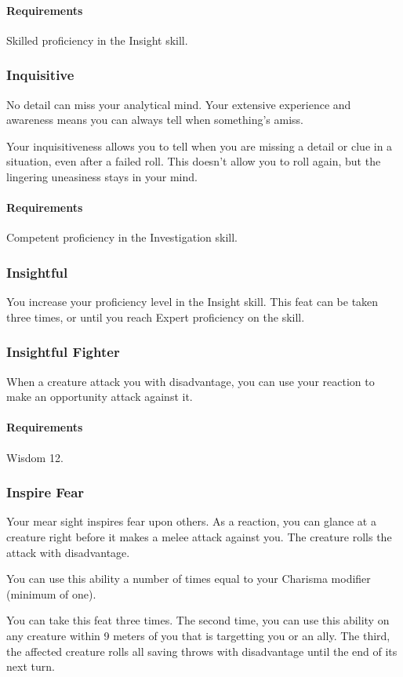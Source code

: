     \paragraph{Requirements} Skilled proficiency in the Insight skill.
\subsubsection{Inquisitive} \label{feat::inquisitive}
    No detail can miss your analytical mind.
    Your extensive experience and awareness means you can always tell when something's amiss.

    Your inquisitiveness allows you to tell when you are missing a detail or clue in a situation, even after a failed roll.
    This doesn't allow you to roll again, but the lingering uneasiness stays in your mind.
    \paragraph{Requirements} Competent proficiency in the Investigation skill.
\subsubsection{Insightful} \label{feat::insightful}
    You increase your proficiency level in the Insight skill.
    This feat can be taken three times, or until you reach Expert proficiency on the skill.
\subsubsection{Insightful Fighter} \label{feat::insightfulfighter}
    When a creature attack you with disadvantage, you can use your reaction to make an opportunity attack against it.
    \paragraph{Requirements} Wisdom 12.
\subsubsection{Inspire Fear} \label{feat::inspirefear}
    Your mear sight inspires fear upon others.
    As a reaction, you can glance at a creature right before it makes a melee attack against you.
    The creature rolls the attack with disadvantage.

    You can use this ability a number of times equal to your Charisma modifier (minimum of one).

    You can take this feat three times.
    The second time, you can use this ability on any creature within 9 meters of you that is targetting you or an ally.
    The third, the affected creature rolls all saving throws with disadvantage until the end of its next turn.
